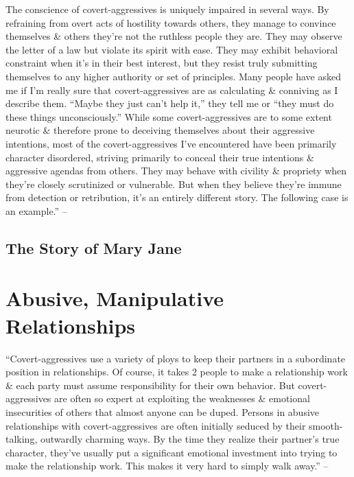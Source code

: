 \documentclass{article}
\numberwithin{equation}{section}
\begin{document}
The conscience of covert-aggressives is uniquely impaired in several ways. By refraining from overt acts of hostility towards others, they manage to convince themselves \& others they're not the ruthless people they are. They may observe the letter of a law but violate its spirit with ease. They may exhibit behavioral constraint when it's in their best interest, but they resist truly submitting themselves to any higher authority or set of principles. Many people have asked me if I'm really sure that covert-aggressives are as calculating \& conniving as I describe them. ``Maybe they just can't help it,'' they tell me or ``they must do these things unconsciously.'' While some covert-aggressives are to some extent neurotic \& therefore prone to deceiving themselves about their aggressive intentions, most of the covert-aggressives I've encountered have been primarily character disordered, striving primarily to conceal their true intentions \& aggressive agendas from others. They may behave with civility \& propriety when they're closely scrutinized or vulnerable. But when they believe they're immune from detection or retribution, it's an entirely different story. The following case is an example.'' -- \cite[pp. 69--70]{Simon2010}

\subsection{The Story of Mary Jane}


\section{Abusive, Manipulative Relationships}
``Covert-aggressives use a variety of ploys to keep their partners in a subordinate position in relationships. Of course, it takes 2 people to make a relationship work \& each party must assume responsibility for their own behavior. But covert-aggressives are often so expert at exploiting the weaknesses \& emotional insecurities of others that almost anyone can be duped. Persons in abusive relationships with covert-aggressives are often initially seduced by their smooth-talking, outwardly charming ways. By the time they realize their partner's true character, they've usually put a significant emotional investment into trying to make the relationship work. This makes it very hard to simply walk away.'' -- \cite[p. 75]{Simon2010}
\end{document}

